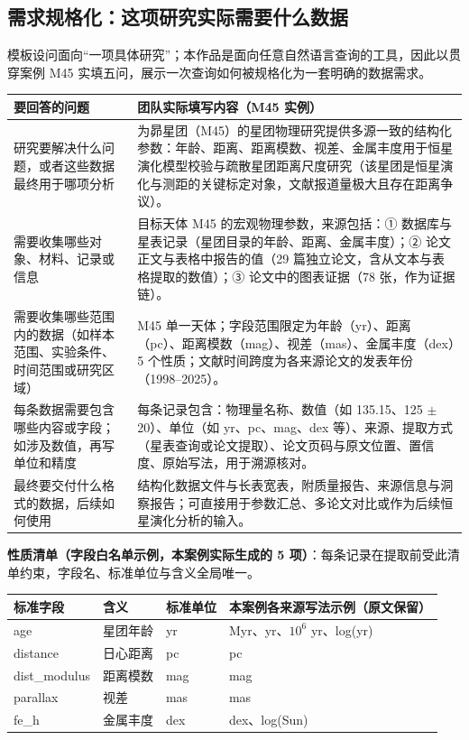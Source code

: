 \subsection{需求规格化：这项研究实际需要什么数据}

模板设问面向“一项具体研究”；本作品是面向任意自然语言查询的工具，因此以贯穿案例 M45 实填五问，展示一次查询如何被规格化为一套明确的数据需求。

\begin{longtable}{@{}p{4.4cm}p{10.6cm}@{}}
\toprule
要回答的问题 & 团队实际填写内容（M45 实例） \\
\midrule
研究要解决什么问题，或者这些数据最终用于哪项分析 & 为昴星团（M45）的星团物理研究提供多源一致的结构化参数：年龄、距离、距离模数、视差、金属丰度用于恒星演化模型校验与疏散星团距离尺度研究（该星团是恒星演化与测距的关键标定对象，文献报道量极大且存在距离争议）。 \\
需要收集哪些对象、材料、记录或信息 & 目标天体 M45 的宏观物理参数，来源包括：① 数据库与星表记录（星团目录的年龄、距离、金属丰度）；② 论文正文与表格中报告的值（29 篇独立论文，含从文本与表格提取的数值）；③ 论文中的图表证据（78 张，作为证据链）。 \\
需要收集哪些范围内的数据（如样本范围、实验条件、时间范围或研究区域） & M45 单一天体；字段范围限定为年龄（yr）、距离（pc）、距离模数（mag）、视差（mas）、金属丰度（dex）5 个性质；文献时间跨度为各来源论文的发表年份（1998--2025）。 \\
每条数据需要包含哪些内容或字段；如涉及数值，再写单位和精度 & 每条记录包含：物理量名称、数值（如 135.15、125 $\pm$ 20）、单位（如 yr、pc、mag、dex 等）、来源、提取方式（星表查询或论文提取）、论文页码与原文位置、置信度、原始写法，用于溯源核对。 \\
最终要交付什么格式的数据，后续如何使用 & 结构化数据文件与长表宽表，附质量报告、来源信息与洞察报告；可直接用于参数汇总、多论文对比或作为后续恒星演化分析的输入。 \\
\bottomrule
\end{longtable}

\noindent\textbf{性质清单（字段白名单示例，本案例实际生成的 5 项）}：每条记录在提取前受此清单约束，字段名、标准单位与含义全局唯一。

\begin{longtable}{@{}p{2.4cm}p{2.6cm}p{2.2cm}p{6.8cm}@{}}
\toprule
标准字段 & 含义 & 标准单位 & 本案例各来源写法示例（原文保留） \\
\midrule
age & 星团年龄 & yr & Myr、yr、$10^{6}$ yr、log(yr) \\
distance & 日心距离 & pc & pc \\
dist\_modulus & 距离模数 & mag & mag \\
parallax & 视差 & mas & mas \\
fe\_h & 金属丰度 & dex & dex、log(Sun) \\
\bottomrule
\end{longtable}

